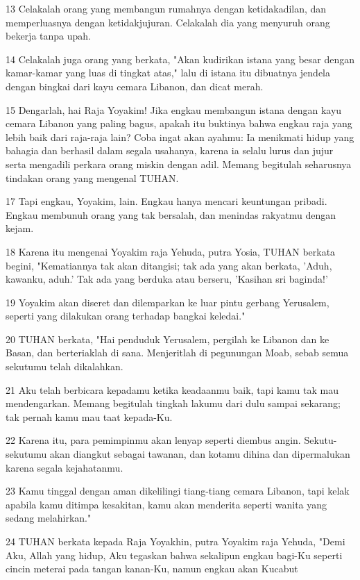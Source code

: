 \par 13 Celakalah orang yang membangun rumahnya dengan ketidakadilan, dan memperluasnya dengan ketidakjujuran. Celakalah dia yang menyuruh orang bekerja tanpa upah.
\par 14 Celakalah juga orang yang berkata, "Akan kudirikan istana yang besar dengan kamar-kamar yang luas di tingkat atas," lalu di istana itu dibuatnya jendela dengan bingkai dari kayu cemara Libanon, dan dicat merah.
\par 15 Dengarlah, hai Raja Yoyakim! Jika engkau membangun istana dengan kayu cemara Libanon yang paling bagus, apakah itu buktinya bahwa engkau raja yang lebih baik dari raja-raja lain? Coba ingat akan ayahmu: Ia menikmati hidup yang bahagia dan berhasil dalam segala usahanya, karena ia selalu lurus dan jujur serta mengadili perkara orang miskin dengan adil. Memang begitulah seharusnya tindakan orang yang mengenal TUHAN.
\par 17 Tapi engkau, Yoyakim, lain. Engkau hanya mencari keuntungan pribadi. Engkau membunuh orang yang tak bersalah, dan menindas rakyatmu dengan kejam.
\par 18 Karena itu mengenai Yoyakim raja Yehuda, putra Yosia, TUHAN berkata begini, "Kematiannya tak akan ditangisi; tak ada yang akan berkata, 'Aduh, kawanku, aduh.' Tak ada yang berduka atau berseru, 'Kasihan sri baginda!'
\par 19 Yoyakim akan diseret dan dilemparkan ke luar pintu gerbang Yerusalem, seperti yang dilakukan orang terhadap bangkai keledai."
\par 20 TUHAN berkata, "Hai penduduk Yerusalem, pergilah ke Libanon dan ke Basan, dan berteriaklah di sana. Menjeritlah di pegunungan Moab, sebab semua sekutumu telah dikalahkan.
\par 21 Aku telah berbicara kepadamu ketika keadaanmu baik, tapi kamu tak mau mendengarkan. Memang begitulah tingkah lakumu dari dulu sampai sekarang; tak pernah kamu mau taat kepada-Ku.
\par 22 Karena itu, para pemimpinmu akan lenyap seperti diembus angin. Sekutu-sekutumu akan diangkut sebagai tawanan, dan kotamu dihina dan dipermalukan karena segala kejahatanmu.
\par 23 Kamu tinggal dengan aman dikelilingi tiang-tiang cemara Libanon, tapi kelak apabila kamu ditimpa kesakitan, kamu akan menderita seperti wanita yang sedang melahirkan."
\par 24 TUHAN berkata kepada Raja Yoyakhin, putra Yoyakim raja Yehuda, "Demi Aku, Allah yang hidup, Aku tegaskan bahwa sekalipun engkau bagi-Ku seperti cincin meterai pada tangan kanan-Ku, namun engkau akan Kucabut

